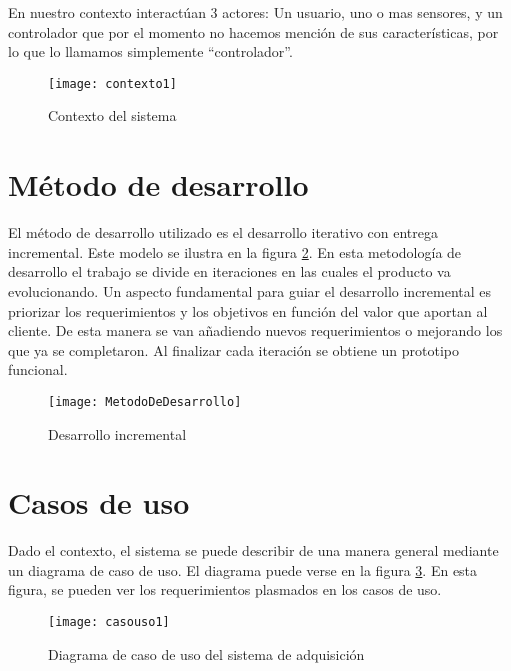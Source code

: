 En nuestro contexto interactúan 3 actores: Un usuario, uno o mas sensores, y un controlador que por el momento no hacemos mención de sus características, por lo que lo llamamos simplemente ``controlador''.

\begin{figure}[h]
  \centering
  \texttt{[image: contexto1]}
  \caption{Contexto del sistema}\label{fig:contexto1}
\end{figure}


\section{Método de desarrollo} %
\label{sec:metodo_de_desarrollo}

El método de desarrollo utilizado es el desarrollo iterativo con entrega incremental. Este modelo se ilustra en la figura \ref{fig:MetodoDeDesarrollo}. En esta metodología de desarrollo el trabajo se divide en iteraciones en las cuales el producto va evolucionando. 
Un aspecto fundamental para guiar el desarrollo incremental es priorizar los requerimientos y los objetivos en función del valor que aportan al cliente. De esta manera se van añadiendo nuevos requerimientos o mejorando los que ya se completaron. Al finalizar cada iteración se obtiene un prototipo funcional.

\begin{figure}[h]
  \centering
  \texttt{[image: MetodoDeDesarrollo]}
  \caption{Desarrollo incremental}\label{fig:MetodoDeDesarrollo}
\end{figure}


\section{Casos de uso} %
\label{sec:casos_de_uso}

Dado el contexto, el sistema se puede describir de una manera general mediante un diagrama de caso de uso. El diagrama puede verse en la figura \ref{fig:casouso1}. En esta figura, se pueden ver los requerimientos plasmados en los casos de uso.

\begin{figure}[h]
  \centering
  \texttt{[image: casouso1]}
  \caption{Diagrama de caso de uso del sistema de adquisición}\label{fig:casouso1}
\end{figure}

